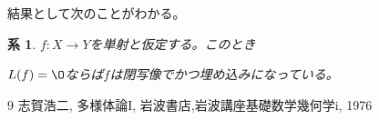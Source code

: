 \documentclass[leqno]{jsarticle}
\newtheorem{cor}[thm]{系}
\begin{document}
結果として次のことがわかる。
\begin{cor}\label{kei}
$f:X\to Y$を単射と仮定する。このとき\par
$L(f)=\O$ならば$f$は閉写像でかつ埋め込みになっている。
\end{cor}












	
\begin{thebibliography}{9}
 志賀浩二, 多様体論I, 岩波書店,岩波講座基礎数学幾何学i, 1976
\end{thebibliography}




			
\end{document}
